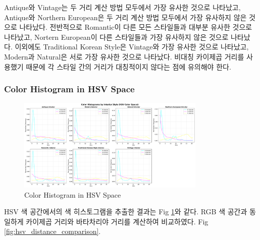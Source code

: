 \documentclass[11pt]{article}
\begin{document}
Antique와 Vintage는 두 거리 계산 방법 모두에서 가장 유사한 것으로 나타났고, Antique와 Northern European은 두 거리 계산 방법 모두에서 가장 유사하지 않은 것으로 나타났다.
전반적으로 Romantic이 다른 모든 스타일들과 대부분 유사한 것으로 나타났고, Nortern European이 다른 스타일들과 가장 유사하지 않은 것으로 나타났다.
이외에도 Traditional Korean Style은 Vintage와 가장 유사한 것으로 나타났고, Modern과 Natural은 서로 가장 유사한 것으로 나타났다.
비대칭 카이제곱 거리를 사용했기 때문에 각 스타일 간의 거리가 대칭적이지 않다는 점에 유의해야 한다.

\subsubsection{Color Histogram in HSV Space}
\begin{figure}[htbp]
    \centering
    \includegraphics[width=0.8\textwidth]{figures/hsv_color_histogram.pdf}
    \caption{Color Histogram in HSV Space}
    \label{fig:hsv_color_histogram}
\end{figure}
HSV 색 공간에서의 색 히스토그램을 추출한 결과는 Fig \ref{fig:hsv_color_histogram}와 같다. RGB 색 공간과 동일하게 카이제곱 거리와 바타차리야 거리를 계산하여 비교하였다. Fig \ref{fig:hsv_distance_comparison}.
\end{document}
